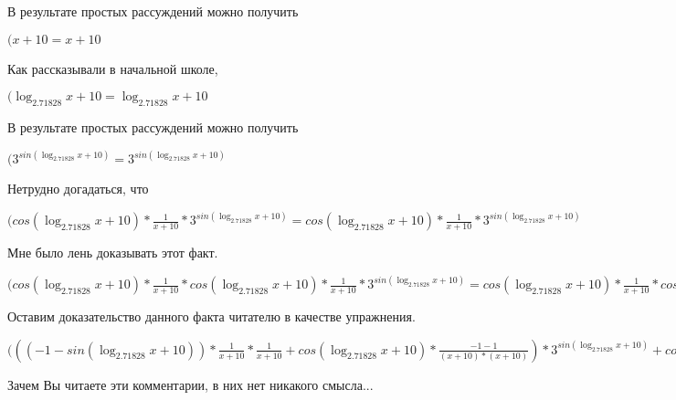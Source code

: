 \documentclass[12pt,a4paper,fleqn]{article}
\theoremstyle{definition}
\begin{document}
В результате простых рассуждений можно получить

$( x  +  10  =  x  +  10 $

Как рассказывали в начальной школе,

$(\log_{ 2.71828 }{ x  +  10 } = \log_{ 2.71828 }{ x  +  10 }$

В результате простых рассуждений можно получить

$({ 3 }^{sin(\log_{ 2.71828 }{ x  +  10 })} = { 3 }^{sin(\log_{ 2.71828 }{ x  +  10 })}$

Нетрудно догадаться, что

$(cos(\log_{ 2.71828 }{ x  +  10 }) * \frac{ 1 }{ x  +  10 }
 * { 3 }^{sin(\log_{ 2.71828 }{ x  +  10 })} = cos(\log_{ 2.71828 }{ x  +  10 }) * \frac{ 1 }{ x  +  10 }
 * { 3 }^{sin(\log_{ 2.71828 }{ x  +  10 })}$

Мне было лень доказывать этот факт.

$(cos(\log_{ 2.71828 }{ x  +  10 }) * \frac{ 1 }{ x  +  10 }
 * cos(\log_{ 2.71828 }{ x  +  10 }) * \frac{ 1 }{ x  +  10 }
 * { 3 }^{sin(\log_{ 2.71828 }{ x  +  10 })} = cos(\log_{ 2.71828 }{ x  +  10 }) * \frac{ 1 }{ x  +  10 }
 * cos(\log_{ 2.71828 }{ x  +  10 }) * \frac{ 1 }{ x  +  10 }
 * { 3 }^{sin(\log_{ 2.71828 }{ x  +  10 })}$

Оставим доказательство данного факта читателю в качестве упражнения.

$((( -1  - sin(\log_{ 2.71828 }{ x  +  10 })) * \frac{ 1 }{ x  +  10 }
 * \frac{ 1 }{ x  +  10 }
 + cos(\log_{ 2.71828 }{ x  +  10 }) * \frac{ -1  -  1 }{( x  +  10 ) * ( x  +  10 )}
) * { 3 }^{sin(\log_{ 2.71828 }{ x  +  10 })} + cos(\log_{ 2.71828 }{ x  +  10 }) * \frac{ 1 }{ x  +  10 }
 * cos(\log_{ 2.71828 }{ x  +  10 }) * \frac{ 1 }{ x  +  10 }
 * { 3 }^{sin(\log_{ 2.71828 }{ x  +  10 })} = (( -1  - sin(\log_{ 2.71828 }{ x  +  10 })) * \frac{ 1 }{ x  +  10 }
 * \frac{ 1 }{ x  +  10 }
 + cos(\log_{ 2.71828 }{ x  +  10 }) * \frac{ -1  -  1 }{( x  +  10 ) * ( x  +  10 )}
) * { 3 }^{sin(\log_{ 2.71828 }{ x  +  10 })} + cos(\log_{ 2.71828 }{ x  +  10 }) * \frac{ 1 }{ x  +  10 }
 * cos(\log_{ 2.71828 }{ x  +  10 }) * \frac{ 1 }{ x  +  10 }
 * { 3 }^{sin(\log_{ 2.71828 }{ x  +  10 })}$

Зачем Вы читаете эти комментарии, в них нет никакого смысла...
\end{document}
